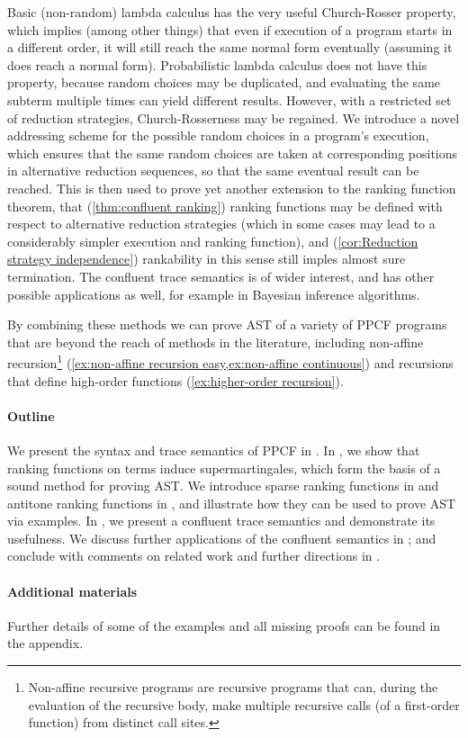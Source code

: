 Basic (non-random) lambda calculus has the very useful Church-Rosser property, which implies (among other things) that even if execution of a program starts in a different order, it will still reach the same normal form eventually (assuming it does reach a normal form). 
Probabilistic lambda calculus does not have this property, because random choices may be duplicated, and evaluating the same subterm multiple times can yield different results. 
However, with a restricted set of reduction strategies, Church-Rosserness may be regained. 
We introduce a novel addressing scheme for the possible random choices in a program's execution, which ensures that the same random choices are taken at corresponding positions in alternative reduction sequences, so that the same eventual result can be reached. 
This is then used to prove yet another extension to the ranking function theorem, that (\cref{thm:confluent ranking}) ranking functions may be defined with respect to alternative reduction strategies (which in some cases may lead to a considerably simpler execution and ranking function), and (\cref{cor:Reduction strategy independence}) rankability in this sense still imples almost sure termination. 
The confluent trace semantics is of wider interest, and has other possible applications as well, for example in Bayesian inference algorithms.

By combining these methods we can prove AST of a variety of PPCF programs that are beyond the reach of methods in the literature, including non-affine recursion\footnote{\label{fnote:non-affine} Non-affine recursive programs are recursive programs that can, during the evaluation of the recursive body, make multiple recursive calls (of a first-order function) from distinct call sites.} (\cref{ex:non-affine recursion easy,ex:non-affine continuous}) and recursions that define high-order functions (\cref{ex:higher-order recursion}).

\paragraph*{Outline}

We present the syntax and trace semantics of PPCF in .
In , we show that ranking functions on terms induce supermartingales, which form the basis of a sound method for proving AST.
We introduce sparse ranking functions in  and antitone ranking functions in , and illustrate how they can be used to prove AST via examples. 
In , we present a confluent trace semantics and demonstrate its usefulness.
We discuss further applications of the confluent semantics in ; and conclude with comments on related work and further directions in .

\paragraph*{Additional materials} Further details of some of the examples and all missing proofs can be found in the appendix.
